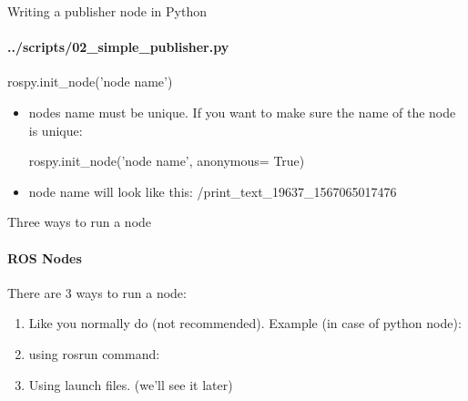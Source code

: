 \documentclass{beamer}
\begin{document}
\begin{frame}[fragile]{Writing a publisher node in Python}
    \framesubtitle{../scripts/02\_simple\_publisher.py}
    \begin{focus}
        \centering
        \fontsize{9}{1} \ttfamily rospy.init\_node({\color{blue}'node name'})
    \end{focus}
    
    \begin{itemize}
        \item nodes name must be unique. If you want to make sure the name of the node is unique:
        
        
        \begin{focus}
            \centering
            \fontsize{9}{1} \ttfamily rospy.init\_node({\color{blue}'node name'}, anonymous= {\color{blue}True})
        \end{focus}
        \item node name will look like this: \ttfamily /print\_text\_19637\_1567065017476
    \end{itemize}
    
\end{frame}



\begin{frame}{Three ways to run a node}
    \framesubtitle{ROS Nodes}
    
    There are 3 ways to run a node:
    \begin{enumerate}
        \item Like you normally do {\tiny{(not recommended)}}. Example (in case of python node):
                \begin{terminal}
                \color{green} 
                \end{terminal}
        \item using rosrun command:
        \begin{terminal}
        \color{green} 
        \end{terminal}
        
        \item Using launch files. \tiny{(we'll see it later)}

    \end{enumerate}
\end{frame}
\end{document}
